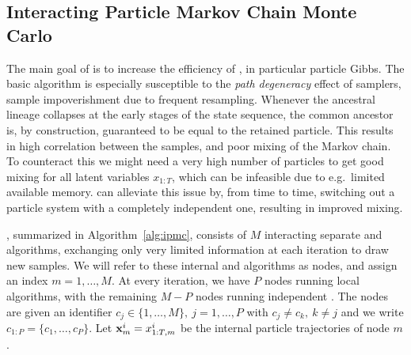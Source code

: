 
\subsection{Interacting Particle Markov Chain Monte Carlo}
\label{sec:method}

The main goal of \ipmcmc is to increase the efficiency of \pmcmc, in particular particle Gibbs. The basic \pg algorithm is especially susceptible to the \emph{path degeneracy} effect of \smc samplers, \ie sample impoverishment due to frequent resampling.  Whenever the ancestral lineage collapses at the early stages of the state sequence, the common ancestor is, by construction, guaranteed to be equal to the retained particle.  This results in high correlation between the samples, and poor mixing of the Markov chain. %
To counteract this we might need a very high number of particles to get good mixing for all latent variables $x_{1:T}$, which can be infeasible due to e.g.~limited available memory. \ipmc can alleviate this issue by, from time to time, switching out a \csmc particle system with a completely independent \smc one, resulting in improved mixing.

\ipmcmc, summarized in Algorithm~\ref{alg:ipmc}, consists of $M$ interacting separate \csmc and \smc algorithms, exchanging only very limited information at each iteration to draw new \mcmc samples. We will refer to these internal \csmc and \smc algorithms as nodes, and assign an index $m=1,\ldots,M$. 
At every iteration, we have $P$ nodes running local \csmc algorithms, with the remaining
$M-P$ nodes running independent \smc.
The \csmc nodes are given an identifier $c_j \in \{1,\ldots,M\}, ~j=1,\ldots,P$ with $c_j \neq c_k,~k \neq j$ and we write $c_{1:P} = \{c_1,\ldots,c_P\}$. Let $\mathbf{x}_m^i = x_{1:T,m}^i$ be the internal particle trajectories of node $m$.


